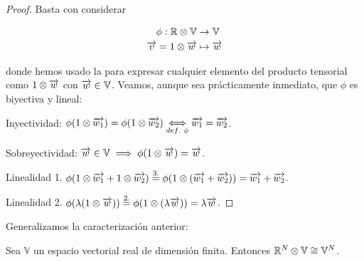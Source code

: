 \begin{proof}
    Basta con considerar

    \begin{equation}
        \begin{split}
            \phi: \mathbb{R} \otimes \mathbb{V} &\to \mathbb{V} \\
            \overrightarrow{v} = 1 \otimes \overrightarrow{w} &\mapsto \overrightarrow{w}
        \end{split}
    \end{equation}

    donde hemos usado la  para expresar cualquier elemento del producto tensorial como $1 \otimes \overrightarrow{w}$ con $\overrightarrow{w} \in \mathbb{V}$. Veamos, aunque sea prácticamente inmediato, que $\phi$ es biyectiva y lineal:

    Inyectividad: $\phi(1 \otimes \overrightarrow{w_1}) = \phi(1 \otimes \overrightarrow{w_2}) \underset{def.\ \phi}{\Longleftrightarrow} \overrightarrow{w_1} = \overrightarrow{w_2}$.

    Sobreyectividad: $\overrightarrow{w} \in \mathbb{V} \implies \phi(1 \otimes \overrightarrow{w}) = \overrightarrow{w}$.

    Linealidad 1. $\phi(1 \otimes \overrightarrow{w_1} + 1 \otimes \overrightarrow{w_2}) \stackrel{\text{3.}}{=} \phi(1 \otimes (\overrightarrow{w_1} + \overrightarrow{w_2})) = \overrightarrow{w_1} + \overrightarrow{w_2}$.

    Linealidad 2. $\phi(\lambda (1 \otimes \overrightarrow{w})) \stackrel{\text{2.}}{=} \phi(1 \otimes (\lambda \overrightarrow{w})) = \lambda \overrightarrow{w}$.

\end{proof}

Generalizamos la caracterización anterior:

\begin{proposicion} Sea $\mathbb{V}$ un espacio vectorial real de dimensión finita. Entonces $\mathbb{R}^N \otimes \mathbb{V}  \cong \mathbb{V}^N$.
\end{proposicion}

